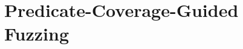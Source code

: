 \chapter[~~~~~~~~~~~~Predicate-Coverage-Guided Fuzzing]{Predicate-Coverage-Guided Fuzzing}
\label{ch:fuzzing}





